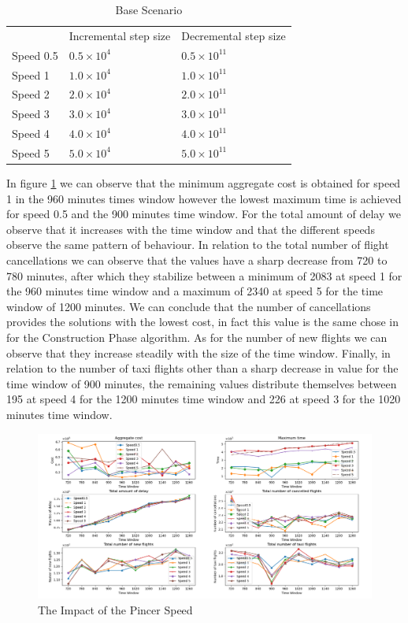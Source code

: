 	\begin{table}[h!]
		\centering
		\caption{Base Scenario}
		\label{tbl:pincerSpeed}
		\begin{tabular}{lll}
			\hline
			& Incremental step size     & Decremental step size      \\
			Speed 0.5 & $0.5 \times 10^{4}$ & $0.5 \times 10^{11}$ \\
			Speed 1   & $1.0 \times 10^{4}$ & $1.0 \times 10^{11}$ \\
			Speed 2   & $2.0 \times 10^{4}$ & $2.0 \times 10^{11}$ \\
			Speed 3   & $3.0 \times 10^{4}$ & $3.0 \times 10^{11}$ \\
			Speed 4   & $4.0 \times 10^{4}$ & $4.0 \times 10^{11}$ \\
			Speed 5   & $5.0 \times 10^{4}$ & $5.0 \times 10^{11}$ \\
			\hline
		\end{tabular}
	\end{table} 

In figure \ref{fig:speed} we can observe that the minimum aggregate cost is obtained for speed 1 in the 960 minutes times window however the lowest maximum time is achieved for speed 0.5 and the 900 minutes time window. For the total amount of delay we observe that it increases with the time window and that the different speeds observe the same pattern of behaviour. In relation to the total number of flight cancellations we can observe that the values have a sharp decrease from 720 to 780 minutes, after which they stabilize between a minimum of 2083 at speed 1 for the 960 minutes time window  and a maximum of 2340 at speed 5 for the time window of 1200 minutes. We can conclude that the number of cancellations provides the solutions with the lowest cost, in fact this value is the same chose in \citep{bisaillon2011} for the Construction Phase algorithm. As for the number of new flights we can observe that they increase steadily with the size of the time window. Finally, in relation to the number of taxi flights other than a sharp decrease in value for the time window of 900 minutes, the remaining values distribute themselves between 195 at speed 4 for the 1200 minutes time window and 226 at speed 3 for the 1020 minutes time window.
 
	\begin{figure}[h!]
		\centering
		\includegraphics[width=\textwidth]{figures/speed2x3.png}
		\caption[]{The Impact of the Pincer Speed}
		\label{fig:speed}
	\end{figure}

